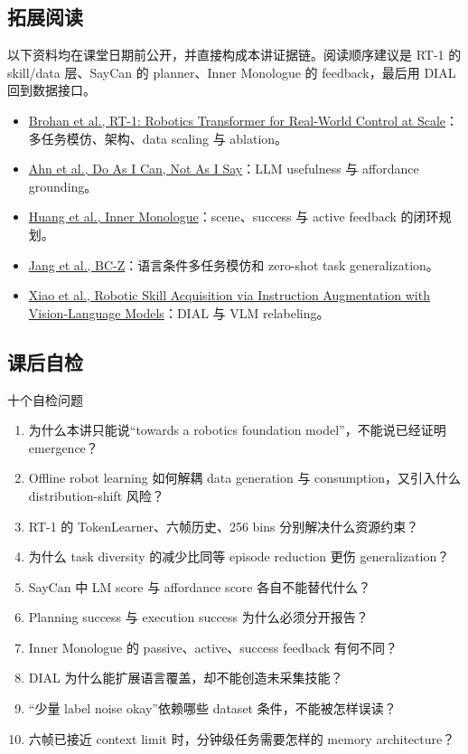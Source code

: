 \subsection{拓展阅读}

以下资料均在课堂日期前公开，并直接构成本讲证据链。阅读顺序建议是 RT-1 的 skill/data 层、SayCan 的 planner、Inner Monologue 的 feedback，最后用 DIAL 回到数据接口。

\begin{itemize}
  \item \href{https://arxiv.org/abs/2212.06817}{Brohan et al., RT-1: Robotics Transformer for Real-World Control at Scale}：多任务模仿、架构、data scaling 与 ablation。
  \item \href{https://arxiv.org/abs/2204.01691}{Ahn et al., Do As I Can, Not As I Say}：LLM usefulness 与 affordance grounding。
  \item \href{https://arxiv.org/abs/2207.05608}{Huang et al., Inner Monologue}：scene、success 与 active feedback 的闭环规划。
  \item \href{https://arxiv.org/abs/2202.02005}{Jang et al., BC-Z}：语言条件多任务模仿和 zero-shot task generalization。
  \item \href{https://arxiv.org/abs/2211.11736}{Xiao et al., Robotic Skill Acquisition via Instruction Augmentation with Vision-Language Models}：DIAL 与 VLM relabeling。
\end{itemize}

\subsection{课后自检}

\begin{importantbox}{十个自检问题}
\begin{enumerate}
  \item 为什么本讲只能说“towards a robotics foundation model”，不能说已经证明 emergence？
  \item Offline robot learning 如何解耦 data generation 与 consumption，又引入什么 distribution-shift 风险？
  \item RT-1 的 TokenLearner、六帧历史、256 bins 分别解决什么资源约束？
  \item 为什么 task diversity 的减少比同等 episode reduction 更伤 generalization？
  \item SayCan 中 LM score 与 affordance score 各自不能替代什么？
  \item Planning success 与 execution success 为什么必须分开报告？
  \item Inner Monologue 的 passive、active、success feedback 有何不同？
  \item DIAL 为什么能扩展语言覆盖，却不能创造未采集技能？
  \item “少量 label noise okay”依赖哪些 dataset 条件，不能被怎样误读？
  \item 六帧已接近 context limit 时，分钟级任务需要怎样的 memory architecture？
\end{enumerate}
\end{importantbox}


